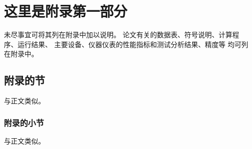 \chapter{这里是附录第一部分}\label{app:1}
未尽事宜可将其列在附录中加以说明。
论文有关的数据表、符号说明、计算程序、运行结果、
主要设备、仪器仪表的性能指标和测试分析结果、精度等
均可列在附录中。
\section{附录的节}
与正文类似。
    \subsection{附录的小节}
    与正文类似。